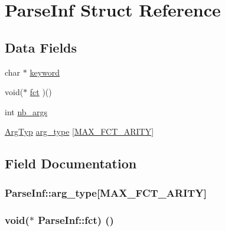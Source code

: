 \hypertarget{structParseInf}{}\section{Parse\+Inf Struct Reference}
\label{structParseInf}
\subsection*{Data Fields}
\begin{DoxyCompactItemize}
\item 
char $\ast$ \hyperlink{structParseInf_affadb424830268d2231588e867b1fb40}{keyword}
\item 
void($\ast$ \hyperlink{structParseInf_a17e09c905211b8d0ac00827aeeea9237}{fct} )()
\item 
int \hyperlink{structParseInf_abb84b55b8b29fe0bccf151d7400f0d9d}{nb\+\_\+args}
\item 
\hyperlink{ma__parser_8h_a55e83ab108ec469cbb59876c09f146b0}{Arg\+Typ} \hyperlink{structParseInf_a4bc1d3c3237113de20adb4050419bca6}{arg\+\_\+type} \mbox{[}\hyperlink{wam__parser_8c_a787c4ef97ee05c3ccf06e55b98f4366a}{M\+A\+X\+\_\+\+F\+C\+T\+\_\+\+A\+R\+I\+TY}\mbox{]}
\end{DoxyCompactItemize}


\subsection{Field Documentation}
\subsubsection[{\texorpdfstring{arg\+\_\+type}{arg_type}}]{ Parse\+Inf\+::arg\+\_\+type\mbox{[}{\bf M\+A\+X\+\_\+\+F\+C\+T\+\_\+\+A\+R\+I\+TY}\mbox{]}}\hypertarget{structParseInf_a4bc1d3c3237113de20adb4050419bca6}{}\label{structParseInf_a4bc1d3c3237113de20adb4050419bca6}
\subsubsection[{\texorpdfstring{fct}{fct}}]{\setlength{\rightskip}{0pt plus 5cm}void($\ast$ Parse\+Inf\+::fct) ()}\hypertarget{structParseInf_a17e09c905211b8d0ac00827aeeea9237}{}\label{structParseInf_a17e09c905211b8d0ac00827aeeea9237}

